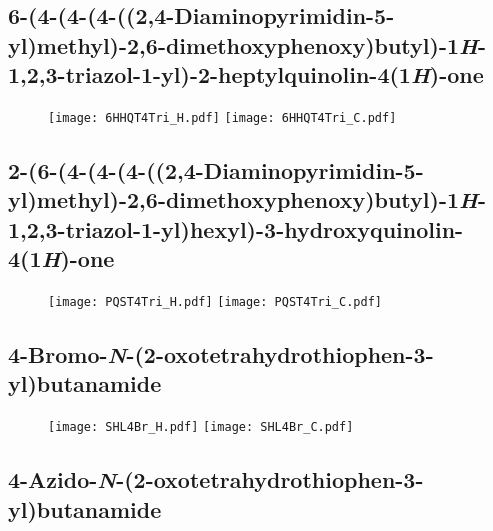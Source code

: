 \subsection{6-(4-(4-(4-((2,4-Diaminopyrimidin-5-yl)methyl)-2,6-dimethoxyphenoxy)butyl)-1\textit{H}-1,2,3-triazol-1-yl)-2-heptylquinolin-4(1\textit{H})-one }

\begin{figure}[H]
	\centering
		\texttt{[image: 6HHQT4Tri\_H.pdf]}
		\texttt{[image: 6HHQT4Tri\_C.pdf]}
\end{figure}

\subsection{2-(6-(4-(4-(4-((2,4-Diaminopyrimidin-5-yl)methyl)-2,6-dimethoxyphenoxy)butyl)-1\textit{H}-1,2,3-triazol-1-yl)hexyl)-3-hydroxyquinolin-4(1\textit{H})-one }

\begin{figure}[H]
	\centering
		\texttt{[image: PQST4Tri\_H.pdf]}
		\texttt{[image: PQST4Tri\_C.pdf]}
\end{figure}


\subsection{4\hyp{}Bromo\hyp{}\textit{N}\hyp{}(2\hyp{}oxotetrahydrothiophen\hyp{}3\hyp{}yl)butanamide }

\begin{figure}[H]
	\centering
		\texttt{[image: SHL4Br\_H.pdf]}
		\texttt{[image: SHL4Br\_C.pdf]}
\end{figure}

\subsection{4\hyp{}Azido\hyp{}\textit{N}\hyp{}(2\hyp{}oxotetrahydrothiophen\hyp{}3\hyp{}yl)butanamide }

